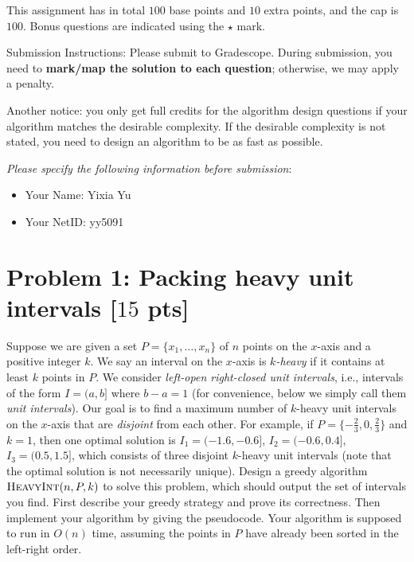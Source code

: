 \documentclass[letterpaper, 11pt]{article}
\newcommand{\1}{\mathds{1}}	%
\theoremstyle{definition}
\newcommand{\problem}[1]{\section*{Problem #1}}
\begin{document}
This assignment has in total $100$ base points and $10$ extra points, and the cap is $100$.
Bonus questions are indicated using the $\star$ mark.

Submission Instructions: Please submit to Gradescope. During submission, you need to \textbf{mark/map the solution to each question}; otherwise, we may apply a penalty. 

Another notice: you only get full credits for the algorithm design questions if your algorithm matches the desirable complexity. If the desirable complexity is not stated, you need to design an algorithm to be as fast as possible.

\textit{Please specify the following information before submission}:
\begin{itemize}
    \item Your Name: Yixia Yu
    \item Your NetID: yy5091
\end{itemize}
\newpage

\problem{1: Packing heavy unit intervals [$15$ pts]}

Suppose we are given a set $P = \{x_1,\dots,x_n\}$ of $n$ points on the $x$-axis and a positive integer $k$.
We say an interval on the $x$-axis is \textit{$k$-heavy} if it contains at least $k$ points in $P$.
We consider \textit{left-open right-closed unit intervals}, i.e., intervals of the form $I = (a,b]$ where $b-a = 1$ (for convenience, below we simply call them \textit{unit intervals}).
Our goal is to find a maximum number of $k$-heavy unit intervals on the $x$-axis that are \textit{disjoint} from each other.
For example, if $P = \{-\frac{2}{3},0,\frac{2}{3}\}$ and $k = 1$, then one optimal solution is $I_1 = (-1.6,-0.6]$, $I_2 = (-0.6,0.4]$, $I_3 = (0.5,1.5]$, which consists of three disjoint $k$-heavy unit intervals (note that the optimal solution is not necessarily unique).
Design a greedy algorithm $\textsc{HeavyInt}(n,P,k)$ to solve this problem, which should output the set of intervals you find.
First describe your greedy strategy and prove its correctness.
Then implement your algorithm by giving the pseudocode.
Your algorithm is supposed to run in $O(n)$ time, assuming the points in $P$ have already been sorted in the left-right order.
\end{document}
